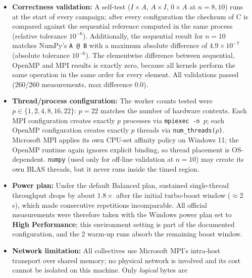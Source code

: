 \documentclass[12pt,a4paper]{article}
\begin{document}
\begin{itemize}
$T_p^{\mathrm{comp}}(n)$ its compute phase. The speedup and efficiency are
$S(p) = T_{\mathrm{seq}}(n) / T_p(n)$ and $E(p) = S(p) / p$. Because the MPI
kernel operates on packed contiguous buffers while the baseline uses
row-pointer storage (see Section~\ref{sec:discussion}), a second speedup
$S_{\mathrm{MPI1}}(p) = T_1^{\mathrm{MPI}}(n) / T_p(n)$ is also reported,
which isolates the pure distribution effect from the data-layout effect.
\item \textbf{Correctness validation:} A self-test
($I \times A$, $A \times I$, $0 \times A$ at $n = 8, 10$) runs at the start
of every campaign; after every configuration the checksum of C is compared
against the sequential reference computed in the same process (relative
tolerance $10^{-6}$). Additionally, the sequential result for $n = 10$ matches
NumPy's \texttt{A @ B} with a maximum absolute difference of
$4.9 \times 10^{-7}$ (absolute tolerance $10^{-6}$). The elementwise
difference between sequential, OpenMP and MPI results is exactly zero,
because all kernels perform the same operation in the same order for every
element. All validations passed (260/260 measurements, max difference
$0.0$).
\item \textbf{Thread/process configuration:} The worker counts tested were
$p \in \{1, 2, 4, 8, 16, 22\}$: $p = 22$ matches the number of hardware
contexts. Each MPI configuration creates exactly $p$ processes via
\texttt{mpiexec -n $p$}; each OpenMP configuration creates exactly $p$
threads via \texttt{num\_threads($p$)}. Microsoft MPI applies its own
CPU-set affinity policy on Windows 11; the OpenMP runtime again ignores
explicit binding, so thread placement is OS-dependent. \texttt{numpy} (used
only for off-line validation at $n = 10$) may create its own BLAS threads,
but it never runs inside the timed region.
\item \textbf{Power plan:} Under the default Balanced plan, sustained
single-thread throughput drops by about $1.8\times$ after the initial
turbo-boost window ($\approx$2 s), which made consecutive repetitions
incomparable. All official measurements were therefore taken with the
Windows power plan set to \textbf{High Performance}; this environment setting
is part of the documented configuration, and the 2 warm-up runs absorb the
remaining boost window.
\item \textbf{Network limitation:} All collectives use Microsoft MPI's
intra-host transport over shared memory; no physical network is involved and
its cost cannot be isolated on this machine. Only \emph{logical} bytes are

\end{itemize}
\end{document}
